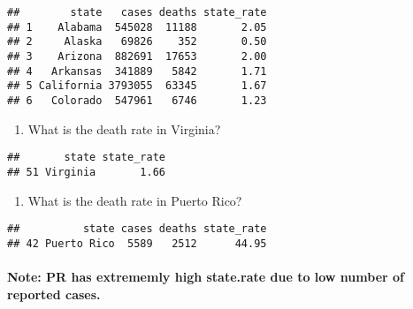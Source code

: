 \documentclass[
]{article}
\newenvironment{Shaded}{\begin{snugshade}}{\end{snugshade}}
\newcommand{\DecValTok}[1]{\textcolor[rgb]{0.00,0.00,0.81}{#1}}
\newcommand{\FunctionTok}[1]{\textcolor[rgb]{0.00,0.00,0.00}{#1}}
\newcommand{\NormalTok}[1]{#1}
\newcommand{\SpecialCharTok}[1]{\textcolor[rgb]{0.00,0.00,0.00}{#1}}
\newcommand{\StringTok}[1]{\textcolor[rgb]{0.31,0.60,0.02}{#1}}
\providecommand{\tightlist}{%
  \setlength{\itemsep}{0pt}\setlength{\parskip}{0pt}}
\begin{document}
\begin{verbatim}
##        state   cases deaths state_rate
## 1    Alabama  545028  11188       2.05
## 2     Alaska   69826    352       0.50
## 3    Arizona  882691  17653       2.00
## 4   Arkansas  341889   5842       1.71
## 5 California 3793055  63345       1.67
## 6   Colorado  547961   6746       1.23
\end{verbatim}

\begin{enumerate}
\def\labelenumi{\alph{enumi}.}
\setcounter{enumi}{2}
\tightlist
\item
  What is the death rate in Virginia?
\end{enumerate}

\begin{Shaded}
\end{Shaded}

\begin{verbatim}
##       state state_rate
## 51 Virginia       1.66
\end{verbatim}

\begin{enumerate}
\def\labelenumi{\alph{enumi}.}
\setcounter{enumi}{3}
\tightlist
\item
  What is the death rate in Puerto Rico?
\end{enumerate}

\begin{Shaded}
\end{Shaded}

\begin{verbatim}
##          state cases deaths state_rate
## 42 Puerto Rico  5589   2512      44.95
\end{verbatim}

\hypertarget{note-pr-has-extrememly-high-state.rate-due-to-low-number-of-reported-cases.}{%
\paragraph{Note: PR has extrememly high state.rate due to low number of
reported
cases.}\label{note-pr-has-extrememly-high-state.rate-due-to-low-number-of-reported-cases.}}
\end{document}
